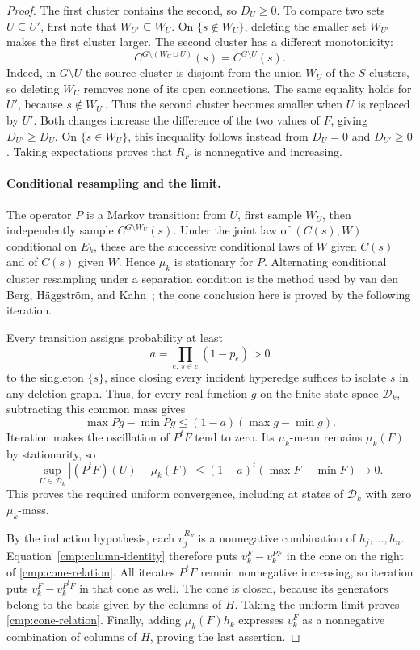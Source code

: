 \documentclass[11pt]{article}
\theoremstyle{definition}
\theoremstyle{remark}
\numberwithin{equation}{section}
\begin{document}
\begin{proof}
The first cluster contains the second, so $D_U\ge0$. To compare two sets
$U\subseteq U'$, first note that $W_{U'}\subseteq W_U$. On
$\{s\notin W_U\}$, deleting the smaller set $W_{U'}$ makes the first
cluster larger. The second cluster has a different monotonicity:
\[
 C^{G\setminus(W_U\cup U)}(s)=C^{G\setminus U}(s).
\]
Indeed, in $G\setminus U$ the source cluster is disjoint from the union
$W_U$ of the $S$-clusters, so deleting $W_U$ removes none of its open
connections. The same equality holds for $U'$, because $s\notin W_{U'}$.
Thus the second cluster becomes smaller when $U$ is replaced by $U'$.
Both changes increase the difference of the two values of $F$, giving
$D_{U'}\ge D_U$. On $\{s\in W_U\}$, this inequality follows instead from
$D_U=0$ and $D_{U'}\ge0$. Taking expectations proves that $R_F$ is
nonnegative and increasing.

\paragraph{Conditional resampling and the limit.}
The operator $P$ is a Markov transition: from $U$, first sample $W_U$, then
independently sample $C^{G\setminus W_U}(s)$. Under the joint law of
$(C(s),W)$ conditional on $E_k$, these are the successive conditional laws
of $W$ given $C(s)$ and of $C(s)$ given $W$. Hence $\mu_k$ is stationary
for $P$. Alternating conditional cluster resampling under a separation
condition is the method used by van den Berg, H\"aggstr\"om, and
Kahn~\cite[Section~2.1, proof of Theorem~2.1]{BHK2006}; the cone conclusion here is proved by
the following iteration.

Every transition assigns probability at least
\[
 a=\prod_{e:\,s\in e}(1-p_e)>0
\]
to the singleton $\{s\}$, since closing every incident hyperedge suffices
to isolate $s$ in any deletion graph. Thus, for every real function $g$ on
the finite state space $\mathcal D_k$, subtracting this common mass gives
\[
 \max Pg-\min Pg\le(1-a)(\max g-\min g).
\]
Iteration makes the oscillation of $P^tF$ tend to zero. Its $\mu_k$-mean
remains $\mu_k(F)$ by stationarity, so
\[
 \sup_{U\in\mathcal D_k}|(P^tF)(U)-\mu_k(F)|
 \le(1-a)^t(\max F-\min F)\longrightarrow0.
\]
This proves the required uniform convergence, including at states of
$\mathcal D_k$ with zero $\mu_k$-mass.

By the induction hypothesis, each $v_j^{R_F}$ is a nonnegative combination
of $h_j,\ldots,h_n$. Equation~\eqref{cmp:column-identity} therefore puts
$v_k^F-v_k^{PF}$ in the cone on the right of
\eqref{cmp:cone-relation}. All iterates $P^tF$ remain nonnegative increasing,
so iteration puts $v_k^F-v_k^{P^tF}$ in that cone as well. The cone is closed,
because its generators belong to the basis given by the columns of $H$.
Taking the uniform limit proves \eqref{cmp:cone-relation}. Finally, adding
$\mu_k(F)h_k$ expresses $v_k^F$ as a nonnegative combination of columns of
$H$, proving the last assertion.
\end{proof}
\end{document}
